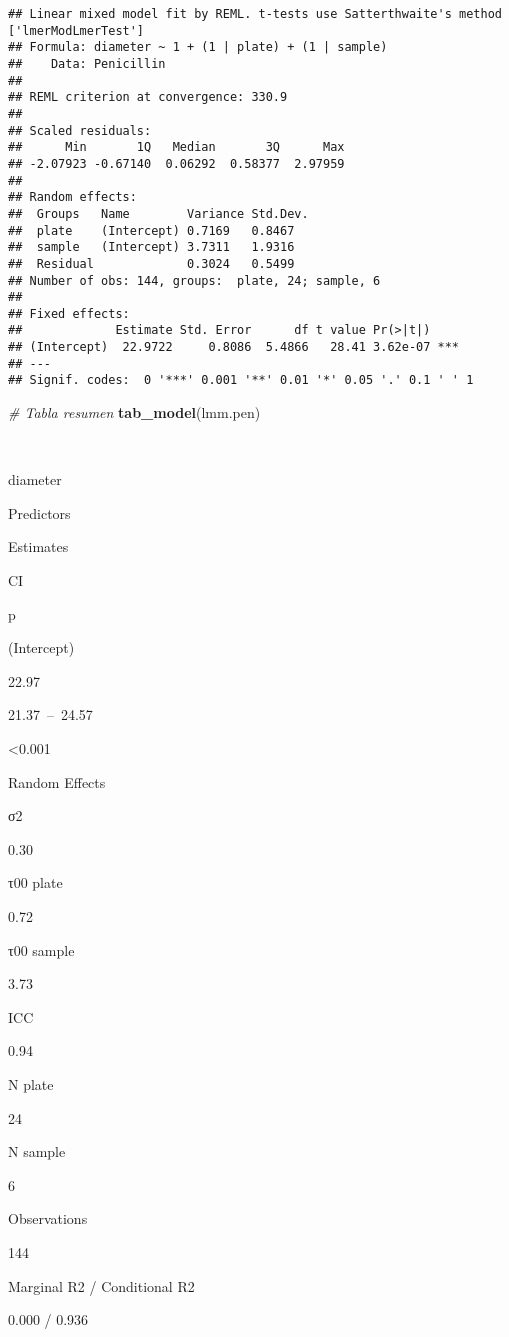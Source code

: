 \documentclass[
]{book}
\newenvironment{Shaded}{\begin{snugshade}}{\end{snugshade}}
\newcommand{\CommentTok}[1]{\textcolor[rgb]{0.56,0.35,0.01}{\textit{#1}}}
\newcommand{\KeywordTok}[1]{\textcolor[rgb]{0.13,0.29,0.53}{\textbf{#1}}}
\newcommand{\NormalTok}[1]{#1}
\begin{document}
\begin{verbatim}
## Linear mixed model fit by REML. t-tests use Satterthwaite's method ['lmerModLmerTest']
## Formula: diameter ~ 1 + (1 | plate) + (1 | sample)
##    Data: Penicillin
## 
## REML criterion at convergence: 330.9
## 
## Scaled residuals: 
##      Min       1Q   Median       3Q      Max 
## -2.07923 -0.67140  0.06292  0.58377  2.97959 
## 
## Random effects:
##  Groups   Name        Variance Std.Dev.
##  plate    (Intercept) 0.7169   0.8467  
##  sample   (Intercept) 3.7311   1.9316  
##  Residual             0.3024   0.5499  
## Number of obs: 144, groups:  plate, 24; sample, 6
## 
## Fixed effects:
##             Estimate Std. Error      df t value Pr(>|t|)    
## (Intercept)  22.9722     0.8086  5.4866   28.41 3.62e-07 ***
## ---
## Signif. codes:  0 '***' 0.001 '**' 0.01 '*' 0.05 '.' 0.1 ' ' 1
\end{verbatim}

\begin{Shaded}
\begin{Highlighting}[]
\CommentTok{# Tabla resumen}
\KeywordTok{tab_model}\NormalTok{(lmm.pen)}
\end{Highlighting}
\end{Shaded}

~

diameter

Predictors

Estimates

CI

p

(Intercept)

22.97

21.37~--~24.57

\textless0.001

Random Effects

σ2

0.30

τ00 plate

0.72

τ00 sample

3.73

ICC

0.94

N plate

24

N sample

6

Observations

144

Marginal R2 / Conditional R2

0.000 / 0.936
\end{document}
